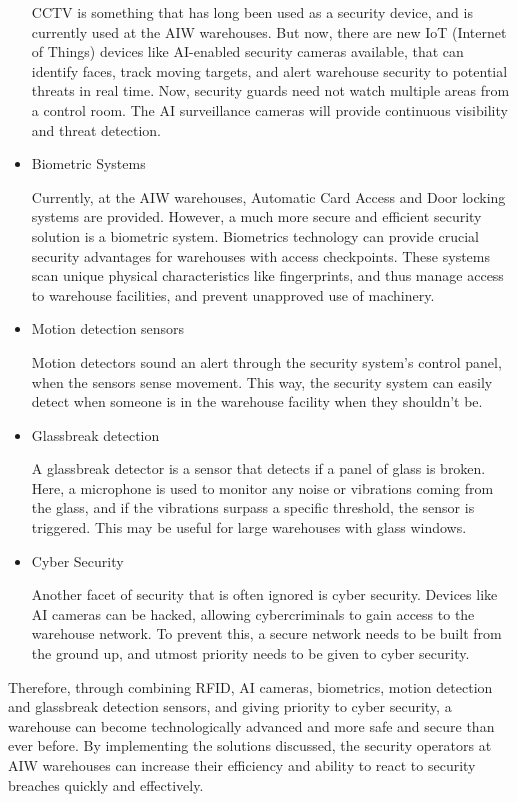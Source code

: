 \documentclass{report}
\begin{document}
\begin{itemize}
{CCTV is something that has long been used as a security device, and is currently used at the AIW warehouses. But now, there are new IoT (Internet of Things) devices like AI-enabled security cameras available, that can identify faces, track moving targets, and alert warehouse security to potential threats in real time. Now, security guards need not watch multiple areas from a control room. The AI surveillance cameras will provide continuous visibility and threat detection.}

\item{Biometric Systems

Currently, at the AIW warehouses, Automatic Card Access and Door locking systems are provided. However, a much more secure and efficient security solution is a biometric system. Biometrics technology can provide crucial security advantages for warehouses with access checkpoints. These systems scan unique physical characteristics like fingerprints, and thus manage access to warehouse facilities, and prevent unapproved use of machinery.}

\item{Motion detection sensors

Motion detectors sound an alert through the security system’s control panel, when the sensors sense movement. This way, the security system can easily detect when someone is in the warehouse facility when they shouldn’t be.}

\item{Glassbreak detection

A glassbreak detector is a sensor that detects if a panel of glass is broken. Here, a microphone is used to monitor any noise or vibrations coming from the glass, and if the vibrations surpass a specific threshold, the sensor is triggered. This may be useful for large warehouses with glass windows.}

\item{Cyber Security

Another facet of security that is often ignored is cyber security. Devices like AI cameras can be hacked, allowing cybercriminals to gain access to the warehouse network. To prevent this, a secure network needs to be built from the ground up, and utmost priority needs to be given to cyber security.}
\end{itemize}
Therefore, through combining RFID, AI cameras, biometrics, motion detection and glassbreak detection sensors, and giving priority to cyber security, a warehouse can become technologically advanced and more safe and secure than ever before. By implementing the solutions discussed, the security operators at AIW warehouses can increase their efficiency and ability to react to security breaches quickly and effectively. 
\end{document}
